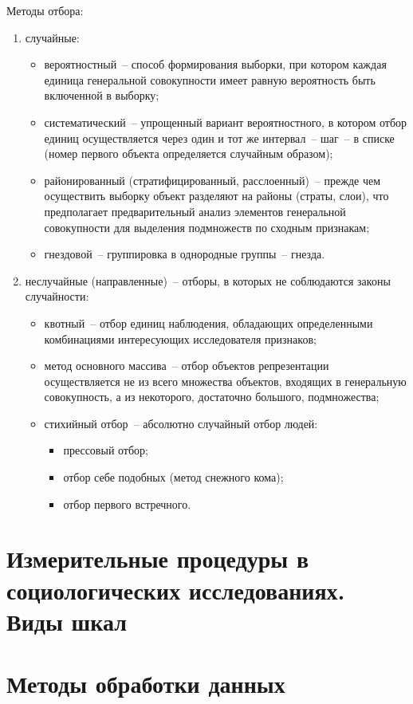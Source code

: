     Методы отбора:
    \begin{enumerate}
      \item случайные:
        \begin{itemize}
          \item вероятностный~-- способ формирования выборки, при котором каждая
            единица генеральной совокупности имеет равную вероятность быть
            включенной в выборку;
          \item систематический~-- упрощенный вариант вероятностного, в котором
            отбор единиц осуществляется через один и тот же интервал~-- шаг~-- в
            списке (номер первого объекта определяется случайным образом);
          \item районированный (стратифицированный, расслоенный)~-- прежде чем
            осуществить выборку объект разделяют на районы (страты, слои), что
            предполагает предварительный анализ элементов генеральной
            совокупности для выделения подмножеств по сходным признакам;
          \item гнездовой~-- группировка в однородные группы~-- гнезда.
        \end{itemize}
      \item неслучайные (направленные)~-- отборы, в которых не соблюдаются
        законы случайности:
        \begin{itemize}
          \item квотный~-- отбор единиц наблюдения, обладающих определенными
            комбинациями интересующих исследователя признаков;
          \item метод основного массива~-- отбор объектов репрезентации
            осуществляется не из всего множества объектов, входящих в
            генеральную совокупность, а из некоторого, достаточно большого,
            подмножества;
          \item стихийный отбор~-- абсолютно случайный отбор людей:
            \begin{itemize}
              \item прессовый отбор;
              \item отбор себе подобных (метод снежного кома);
              \item отбор первого встречного.
            \end{itemize}
        \end{itemize}
    \end{enumerate}

  \section{Измерительные процедуры в социологических исследованиях. Виды шкал}

  \section{Методы обработки данных}
